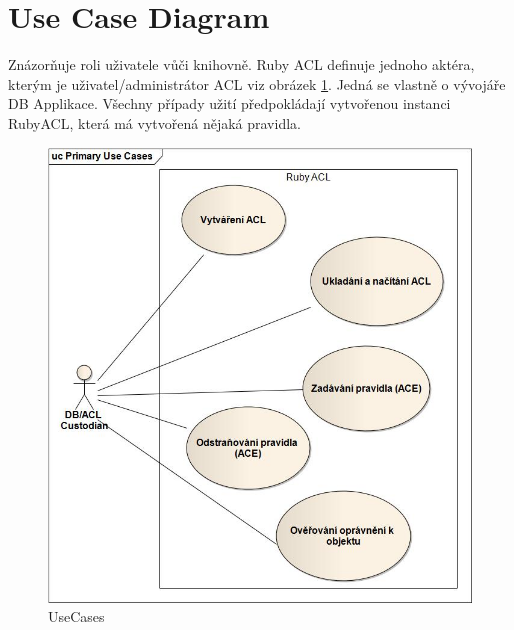\documentclass[11pt,twoside,a4paper]{book}
\begin{document}
\section{Use Case Diagram}
Znázorňuje roli uživatele vůči knihovně. Ruby ACL definuje jednoho aktéra, kterým je uživatel/administrátor ACL viz obrázek \ref{fig:usecase}. Jedná se vlastně o vývojáře DB Applikace.
Všechny případy užití předpokládají vytvořenou instanci RubyACL, která má vytvořená nějaká pravidla.
\begin{figure}
\includegraphics[width=15cm]{UseCases.jpg}
\caption{UseCases}
\label{fig:usecase}
\end{figure}
\end{document}
